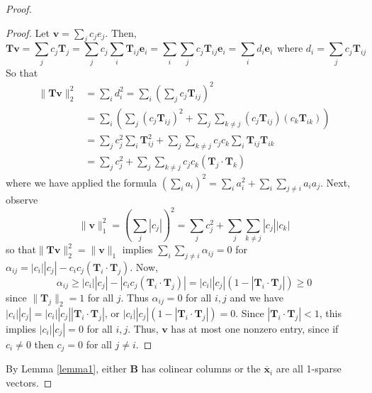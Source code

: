 \documentclass[journal, onecolumn]{IEEEtran}
\begin{document}
\begin{proof}
\begin{proof}
Let $\mathbf{v} = \sum_j c_j e_j$. Then,
\begin{equation}
\mathbf{Tv} 
= \sum_j c_j \mathbf{T}_j 
= \sum_j c_j \sum_i \mathbf{T}_{ij} \mathbf{e}_i 
= \sum_i \sum_j c_j \mathbf{T}_{ij} \mathbf{e}_i 
= \sum_i d_i \mathbf{e}_i \ \ \text{where } d_i 
= \sum_j c_j \mathbf{T}_{ij} 
\end{equation}
So that 
\begin{align}
\|\mathbf{Tv}\|_2^2 
&= \sum_i d_i^2 
= \sum_i \left( \sum_j c_j \mathbf{T}_{ij} \right)^2  \\
&= \sum_i \left( \sum_j \left(c_j \mathbf{T}_{ij} \right)^2 + \sum_j \sum_{k \neq j} \left(c_j \mathbf{T}_{ij} \right) \left( c_k \mathbf{T}_{ik} \right) \right) \\
&= \sum_j c_j^2 \sum_i \mathbf{T}_{ij}^2 + \sum_j \sum_{k \neq j} c_j c_k \sum_i \mathbf{T}_{ij} \mathbf{T}_{ik} \\
&= \sum_j c_j^2 + \sum_j \sum_{k \neq j} c_j c_k \left( \mathbf{T}_j \cdot \mathbf{T}_k \right)
\end{align}
where we have applied the formula $\left( \sum_i a_i \right)^2 = \sum_i a_i^2 + \sum_i \sum_{j \neq i} a_i a_j$. Next, observe 
\begin{equation}
\|\mathbf{v}\|_1^2 = \left( \sum_j |c_j| \right)^2 = \sum_j c_j^2 + \sum_j \sum_{k \neq j} |c_j| |c_k|
\end{equation}
so that$\|\mathbf{Tv}\|_2^2 = \|\mathbf{v}\|_1$ implies $\sum_i \sum_{j\neq i} \alpha_{ij} = 0$ for $\alpha_{ij} = |c_i| |c_j| - c_i c_j \left(\mathbf{T}_i \cdot \mathbf{T}_j \right)$. Now,
\begin{equation}
\alpha_{ij} 
\geq |c_i| |c_j| - |c_i c_j \left(\mathbf{T}_i \cdot \mathbf{T}_j \right)|
= |c_i| |c_j| \left(1 - |\mathbf{T}_i \cdot \mathbf{T}_j | \right)
\geq 0
\end{equation}
since $\|\mathbf{T}_j\|_2 = 1$ for all $j$. Thus $\alpha_{ij} = 0$ for all $i, j$ and we have $|c_i| |c_j| = |c_i| |c_j| |\mathbf{T}_i \cdot \mathbf{T}_j |$, or $ |c_i| |c_j| \left(1 - |\mathbf{T}_i \cdot \mathbf{T}_j | \right) = 0$. Since $|\mathbf{T}_i \cdot \mathbf{T}_j| < 1$, this implies $|c_i| |c_j| = 0$ for all $i, j$. Thus, $\mathbf{v}$ has at most one nonzero entry, since if $c_i \neq 0$ then $c_j = 0$ for all $j \neq i$.
\end{proof}

By Lemma \ref{lemma1}, either $\mathbf{B}$ has colinear columns or the $\mathbf{\overline x}_i$ are all 1-sparse vectors. 


\end{proof}
\end{document}

